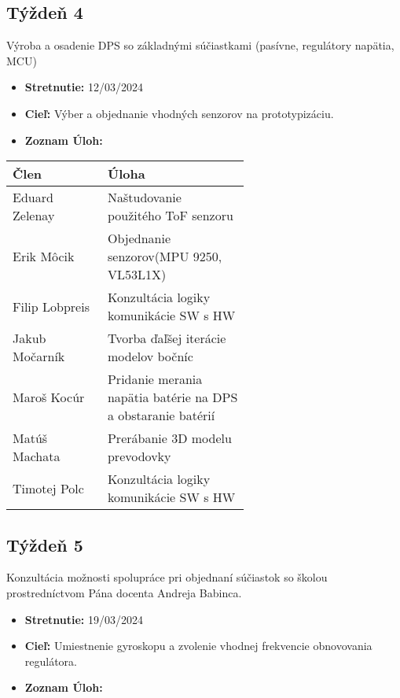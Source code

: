 \subsection{Týždeň 4}
Výroba a osadenie DPS so základnými súčiastkami (pasívne, regulátory napätia, MCU)
\begin{itemize}
    \item \textbf{Stretnutie:} 12/03/2024
    \item \textbf{Cieľ: } Výber a objednanie vhodných senzorov na prototypizáciu.
    \item \textbf{Zoznam Úloh:}
\end{itemize}

\begin{table}[H]
    \centering
    \begin{tabular}{|l|p{0.6\linewidth}|}
        \hline
        \textbf{Člen} & \textbf{Úloha} \\
        \hline
        Eduard Zelenay & Naštudovanie použitého ToF senzoru \\
        \hline
        Erik Môcik & Objednanie senzorov(MPU 9250, VL53L1X) \\
        \hline
        Filip Lobpreis & Konzultácia logiky komunikácie SW s HW \\
        \hline
        Jakub Močarník & Tvorba ďaľšej iterácie modelov bočníc \\
        \hline
        Maroš Kocúr & Pridanie merania napätia batérie na DPS a obstaranie batérií \\
        \hline
        Matúš Machata & Prerábanie 3D modelu prevodovky \\
        \hline
        Timotej Polc & Konzultácia logiky komunikácie SW s HW \\
        \hline
    \end{tabular}
\end{table}

\subsection{Týždeň 5}
Konzultácia možnosti spolupráce pri objednaní súčiastok so školou prostredníctvom Pána docenta Andreja Babinca.
\begin{itemize}
    \item \textbf{Stretnutie:} 19/03/2024
    \item \textbf{Cieľ: } Umiestnenie gyroskopu a zvolenie vhodnej frekvencie obnovovania regulátora.
    \item \textbf{Zoznam Úloh:}
\end{itemize}

